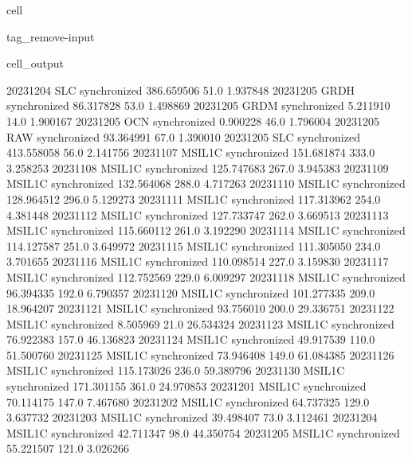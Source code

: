 \documentclass[letterpaper,10pt,english]{jupyterBook}
\begin{document}
\begin{sphinxuseclass}{cell}
\begin{sphinxuseclass}{tag_remove-input}
\begin{sphinxVerbatimOutput}
\begin{sphinxuseclass}{cell_output}
\begin{sphinxVerbatim}[commandchars=\\\{\}]
2023\PYGZhy{}12\PYGZhy{}04          SLC  synchronized  386.659506    51.0    1.937848
2023\PYGZhy{}12\PYGZhy{}05         GRDH  synchronized   86.317828    53.0    1.498869
2023\PYGZhy{}12\PYGZhy{}05         GRDM  synchronized    5.211910    14.0    1.900167
2023\PYGZhy{}12\PYGZhy{}05          OCN  synchronized    0.900228    46.0    1.796004
2023\PYGZhy{}12\PYGZhy{}05          RAW  synchronized   93.364991    67.0    1.390010
2023\PYGZhy{}12\PYGZhy{}05          SLC  synchronized  413.558058    56.0    2.141756
2023\PYGZhy{}11\PYGZhy{}07       MSIL1C  synchronized  151.681874   333.0    3.258253
2023\PYGZhy{}11\PYGZhy{}08       MSIL1C  synchronized  125.747683   267.0    3.945383
2023\PYGZhy{}11\PYGZhy{}09       MSIL1C  synchronized  132.564068   288.0    4.717263
2023\PYGZhy{}11\PYGZhy{}10       MSIL1C  synchronized  128.964512   296.0    5.129273
2023\PYGZhy{}11\PYGZhy{}11       MSIL1C  synchronized  117.313962   254.0    4.381448
2023\PYGZhy{}11\PYGZhy{}12       MSIL1C  synchronized  127.733747   262.0    3.669513
2023\PYGZhy{}11\PYGZhy{}13       MSIL1C  synchronized  115.660112   261.0    3.192290
2023\PYGZhy{}11\PYGZhy{}14       MSIL1C  synchronized  114.127587   251.0    3.649972
2023\PYGZhy{}11\PYGZhy{}15       MSIL1C  synchronized  111.305050   234.0    3.701655
2023\PYGZhy{}11\PYGZhy{}16       MSIL1C  synchronized  110.098514   227.0    3.159830
2023\PYGZhy{}11\PYGZhy{}17       MSIL1C  synchronized  112.752569   229.0    6.009297
2023\PYGZhy{}11\PYGZhy{}18       MSIL1C  synchronized   96.394335   192.0    6.790357
2023\PYGZhy{}11\PYGZhy{}20       MSIL1C  synchronized  101.277335   209.0   18.964207
2023\PYGZhy{}11\PYGZhy{}21       MSIL1C  synchronized   93.756010   200.0   29.336751
2023\PYGZhy{}11\PYGZhy{}22       MSIL1C  synchronized    8.505969    21.0   26.534324
2023\PYGZhy{}11\PYGZhy{}23       MSIL1C  synchronized   76.922383   157.0   46.136823
2023\PYGZhy{}11\PYGZhy{}24       MSIL1C  synchronized   49.917539   110.0   51.500760
2023\PYGZhy{}11\PYGZhy{}25       MSIL1C  synchronized   73.946408   149.0   61.084385
2023\PYGZhy{}11\PYGZhy{}26       MSIL1C  synchronized  115.173026   236.0   59.389796
2023\PYGZhy{}11\PYGZhy{}30       MSIL1C  synchronized  171.301155   361.0   24.970853
2023\PYGZhy{}12\PYGZhy{}01       MSIL1C  synchronized   70.114175   147.0    7.467680
2023\PYGZhy{}12\PYGZhy{}02       MSIL1C  synchronized   64.737325   129.0    3.637732
2023\PYGZhy{}12\PYGZhy{}03       MSIL1C  synchronized   39.498407    73.0    3.112461
2023\PYGZhy{}12\PYGZhy{}04       MSIL1C  synchronized   42.711347    98.0   44.350754
2023\PYGZhy{}12\PYGZhy{}05       MSIL1C  synchronized   55.221507   121.0    3.026266

\end{sphinxVerbatim}
\end{sphinxuseclass}
\end{sphinxVerbatimOutput}
\end{sphinxuseclass}
\end{sphinxuseclass}
\end{document}
